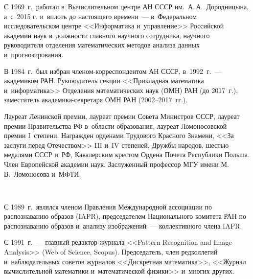       
      С 1969~г.\ работал в~Вычислительном центре АН СССР им.\ А.\,А.~Дородницына, 
а~с~2015 г. и~вплоть до настоящего времени~--- в~Федеральном исследовательском центре 
<<Информатика и~управление>> Российской академии наук в~должности главного научного 
сотрудника, научного руководителя отделения математических методов анализа данных 
и~прогнозирования. 
      
      В 1984~г.\ был избран чле\-ном-кор\-рес\-пон\-ден\-том АН СССР, в~1992~г.~--- 
академиком РАН. Руководитель секции <<Прикладная математика и~информатика>> 
Отделения математических наук (ОМН) РАН (до 2017~г.), заместитель академика-секретаря 
ОМН РАН (2002--2017~гг.).
      
      Лауреат Ленинской премии, лауреат премии Совета Министров СССР, лауреат 
премии Правительства РФ в~области образования, лауреат Ломоносовской премии I~степени. 
Награжден орденами Трудового Красного Знамени, <<За заслуги перед Отечеством>> III 
и~IV степеней, Дружбы народов, \mbox{шестью} медалями СССР и~РФ, Кавалерским 
крестом Ордена Почета Республики Польша. Член Европейской академии наук. 
Заслуженный профессор МГУ имени М.\,В.~Ломоносова и~МФТИ.
      
      

\pagebreak

\

\vspace*{-12pt}


\begin{floatingfigure}{50mm} %
\begin{center} %
\vspace*{6pt}
\mbox{%

\epsfxsize=39.007mm %
\epsfbox{nzur-2.eps}
}
\end{center}
\vspace*{-6pt}
\end{floatingfigure}

\noindent



     \thispagestyle{empty}
     
     С 1989~г.\ являлся членом Правления Международной ассоциации по распознаванию 
образов (IAPR), председателем Национального комитета РАН по распознаванию образов 
и~анализу изображений~--- коллективного члена IAPR.
     
     С 1991~г.~--- главный редактор журнала <<Pattern Recognition and Image Analysis>> 
(Web of Science, Scopus). Председатель, член редколлегий и~наблюдательных советов 
журналов <<Дискретная математика>>, <<Журнал вычислительной математики 
и~математической физики>> и~многих других.
      
